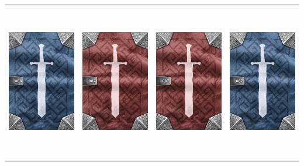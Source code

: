 \documentclass{minimal}
\begin{document}
{\begin{longtable}{llll}
\includegraphics[width=44mm,height=68mm]{./64-151/gh-088a-wand-of-darkness-back.png} &
\includegraphics[width=44mm,height=68mm]{./64-151/gh-087b-wand-of-brilliance-back.png} &
\includegraphics[width=44mm,height=68mm]{./64-151/gh-087b-wand-of-brilliance-back.png} &
\includegraphics[width=44mm,height=68mm]{./64-151/gh-087a-wand-of-brilliance-back.png}\\ 

\end{longtable}}
\end{document}
